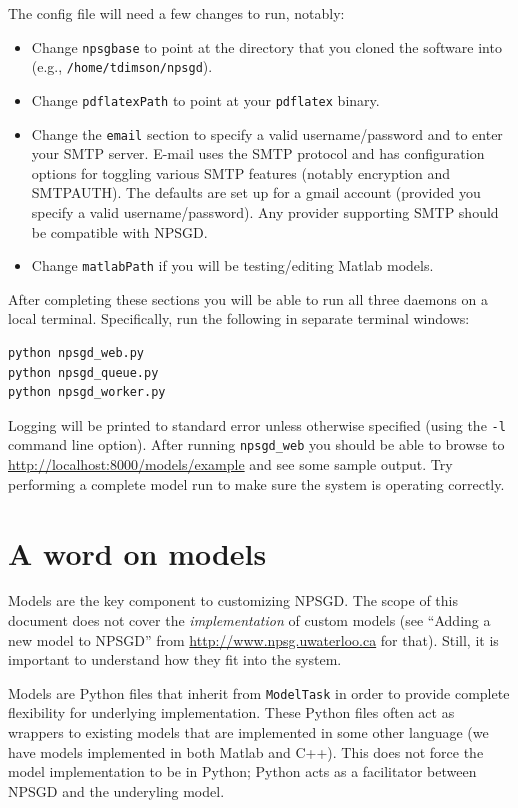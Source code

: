 \documentclass{article}
\newcommand{\mclass}[1]{\texttt{#1}}
\begin{document}
The config file will need a few changes to run, notably:
\begin{itemize}
    \item Change \texttt{npsgbase} to point at the directory that you cloned the
    software into (e.g., \texttt{/home/tdimson/npsgd}).
    \item Change \texttt{pdflatexPath} to point at your \texttt{pdflatex}
    binary.
    \item Change the \texttt{email} section to specify a valid
    username/password and to enter your SMTP server. E-mail uses the SMTP protocol
    and has configuration
    options for toggling various SMTP features (notably encryption and
    SMTPAUTH). The defaults are set up for a gmail 
    account (provided you specify a valid username/password). Any provider
    supporting SMTP should be compatible with NPSGD.
    \item Change \texttt{matlabPath} if you will be testing/editing Matlab
    models.
\end{itemize}

After completing these sections you will be able to run all three daemons on a
local terminal. Specifically, run the following in separate terminal windows:
\begin{verbatim}
python npsgd_web.py
python npsgd_queue.py
python npsgd_worker.py
\end{verbatim}
Logging will be printed to standard error unless otherwise specified (using the
\texttt{-l} command line option). After
running \texttt{npsgd\_web} you should be able to browse to
\url{http://localhost:8000/models/example} and see some sample output. Try
performing a complete model run to make sure the system is operating correctly.

\section{A word on models}
Models are the key component to customizing NPSGD. The scope of this document
does not cover the \textit{implementation} of custom models (see ``Adding a new
model to NPSGD'' from \url{http://www.npsg.uwaterloo.ca} for that). Still, it is important to understand how they fit
into the system.

Models are Python files that inherit from \mclass{ModelTask} in
order to provide complete flexibility for underlying implementation. These
Python files often act as wrappers to existing models that are implemented in
some other language (we have models implemented in both Matlab and C++). 
This does not force the model implementation to be in Python;
Python acts as a facilitator between NPSGD and the underyling model. 
\end{document}

